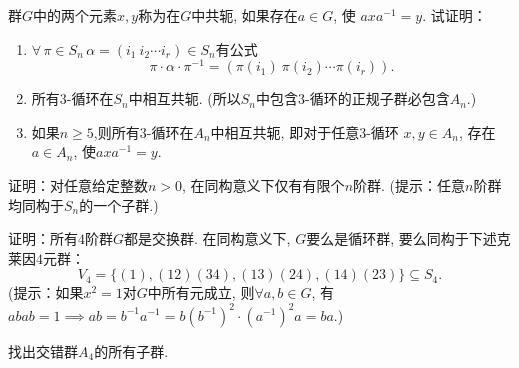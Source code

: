 \begin{solution}
    
\end{solution}

\begin{problem}
    群$G$中的两个元素$x, y$称为在$G$中共轭, 如果存在$a \in G$, 使
$axa^{-1} = y$. 试证明：
\begin{enumerate}[(1)]
    \item $\forall\, \pi \in S_n\, \alpha = (i_1\:i_2 \cdots i_r) \in S_n$有公式
\[
    \pi \cdot \alpha \cdot \pi^{-1} = (\pi(i_1)\:\pi(i_2) \cdots \pi(i_r)).
\]
    \item 所有$3$-循环在$S_n$中相互共轭.
(所以$S_n$中包含$3$-循环的正规子群必包含$A_n$.)
    \item 如果$n \geqslant 5$,则所有$3$-循环在$A_n$中相互共轭, 即对于任意$3$-循环
$x,y \in A_n$, 存在$a \in A_n$, 使$axa^{-1} = y$.
\end{enumerate}
\end{problem}

\begin{solution}
    
\end{solution}

\begin{problem}
    证明：对任意给定整数$n > 0$, 在同构意义下仅有有限个$n$阶群.
(提示：任意$n$阶群均同构于$S_n$的一个子群.)
\end{problem}

\begin{solution}
    
\end{solution}

\begin{problem}
    证明：所有$4$阶群$G$都是交换群. 在同构意义下, $G$要么是循环群, 
要么同构于下述克莱因$4$元群：
\[
    V_4 = \{(1), (12)(34), (13)(24), (14)(23)\} \subseteq S_4.
\]
(提示：如果$x^2 = 1$对$G$中所有元成立, 则$\forall a, b \in G$, 有
$abab = 1 \implies ab = b^{-1}a^{-1} = b(b^{-1})^2 \cdot (a^{-1})^2a = ba.$)
\end{problem}

\begin{solution}
    
\end{solution}

\begin{problem}
    找出交错群$A_4$的所有子群.
\end{problem}

\begin{solution}

\end{solution}